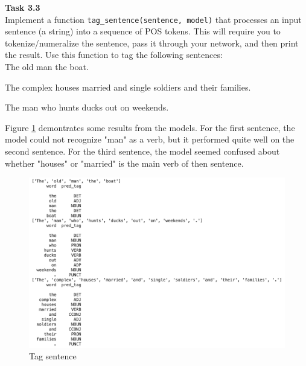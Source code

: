 \documentclass[12pt,article]{article}
\newenvironment{task}[2][Task]
    { \begin{mdframed}[backgroundcolor=gray!20] \textbf{#1 #2} \\}
    {  \end{mdframed}}
\begin{document}
\newpage
\begin{task}{3.3} 
Implement a function \texttt{tag\_sentence(sentence, model)} that processes an input sentence (a string) into a sequence of POS tokens. This will require you to tokenize/numeralize the sentence, pass it through your network, and then print the result. Use this function to tag the following sentences:\\[5pt]

The old man the boat.

The complex houses married and single soldiers and their families.

The man who hunts ducks out on weekends.    
\end{task}

Figure \ref{fig:tag-sentence} demontrates some results from the models. For the first sentence, the model could not recognize "man" as a verb, but it performed quite well on the second sentence. For the third sentence, the model seemed confused about whether "houses" or "married" is the main verb of then sentence.

\begin{figure}[H]
    \centering
    \includegraphics[scale=0.6]{tag-sentence.png} \par
    \caption{Tag sentence}
    \label{fig:tag-sentence}
\end{figure}



\end{document}
